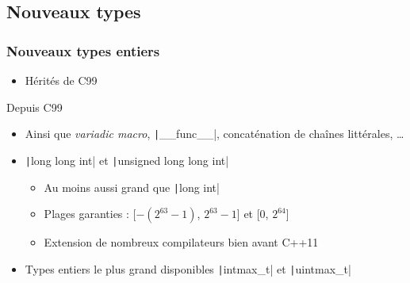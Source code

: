 \documentclass[C++.tex]{subfiles}
\begin{document}
\subsection*{Nouveaux types}
\begin{frame}[fragile]
	\frametitle{Nouveaux types entiers}
	\begin{itemize}
		\item Hérités de C99
	\end{itemize}

	\begin{block}{Depuis C99}
		\begin{itemize}
			\item Ainsi que \textit{variadic macro}, \texttt|__func__|, concaténation de chaînes littérales, \ldots{}
		\end{itemize}
	\end{block}

	\begin{itemize}
		\item \texttt|long long int| et \texttt|unsigned long long int|
		\begin{itemize}
			\item Au moins aussi grand que \texttt|long int|
			\item Plages garanties : [$-(2^{63}-1)$, $2^{63}-1$] et [$0$, $2^{64}$]
			\item Extension de nombreux compilateurs bien avant C++11
		\end{itemize}
		\item Types entiers le plus grand disponibles \texttt|intmax_t| et \texttt|uintmax_t|
	\end{itemize}

\end{frame}
\end{document}
